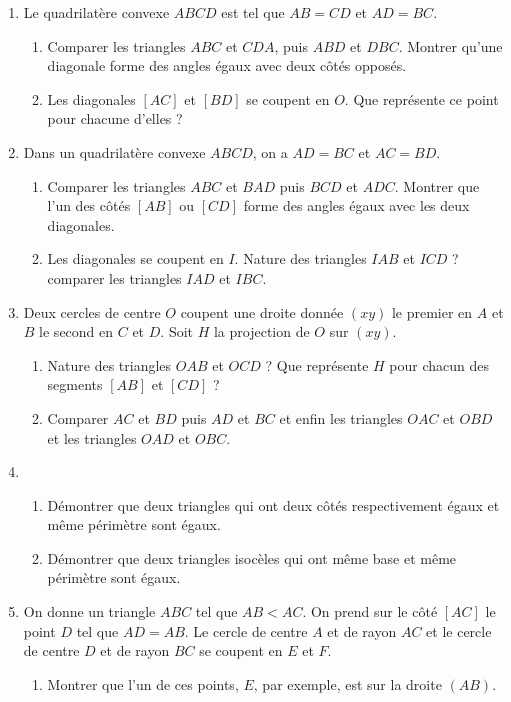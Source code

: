 \begin{enumerate}
\begin{enumerate}
\end{enumerate}
\item Le quadrilatère convexe $ABCD$ est tel que $AB=CD$ et $AD=BC$. \begin{enumerate}
\item Comparer les triangles $ABC$ et $CDA$, puis $ABD$ et $DBC$. Montrer qu'une diagonale forme des angles égaux avec deux côtés opposés. 
\item Les diagonales $[AC]$ et $[BD]$ se coupent en $O$. Que représente ce point pour
chacune d'elles ?
\end{enumerate}
\item Dans un quadrilatère convexe $ABCD$, on a $AD=BC$ et $AC=BD$. 
\begin{enumerate}
\item Comparer les triangles $ABC$ et $BAD$ puis $BCD$ et $ADC$. Montrer que l'un des côtés $[AB]$ ou $[CD]$ forme des angles égaux avec les deux diagonales.
\item Les diagonales se coupent en $I$. Nature des triangles $IAB$ et $ICD$ ? 
comparer les triangles $IAD$ et $IBC$. 
\end{enumerate}
\item Deux cercles de centre $O$ coupent une droite donnée $(xy)$ le premier en $A$ et $B$ le second en $C$ et $D$. Soit $H$ la projection de $O$ sur $(xy)$.
\begin{enumerate}
\item Nature des triangles $OAB$ et $OCD$ ? Que représente $H$ pour chacun des segments $[AB]$ et $[CD]$ ?
\item Comparer $AC$ et $BD$ puis $AD$ et $BC$ et enfin les triangles $OAC$ et $OBD$ et les triangles $OAD$ et $OBC$.
\end{enumerate}
\item \begin{enumerate}
\item Démontrer que deux triangles qui ont deux côtés respectivement égaux et même périmètre sont égaux.
\item Démontrer que deux triangles isocèles qui ont même base et même périmètre sont égaux.
\end{enumerate}
\item On donne un triangle $ABC$ tel que $AB<AC$. On prend sur le côté $[AC]$ le point $D$ tel que $AD=AB$. Le cercle de centre $A$ et de rayon $AC$ et le cercle de centre $D$ et de rayon $BC$ se coupent en $E$ et $F$. \begin{enumerate}
\item Montrer que l'un de ces points, $E$, par exemple, est sur la droite $(AB)$. 

\end{enumerate}
\end{enumerate}
